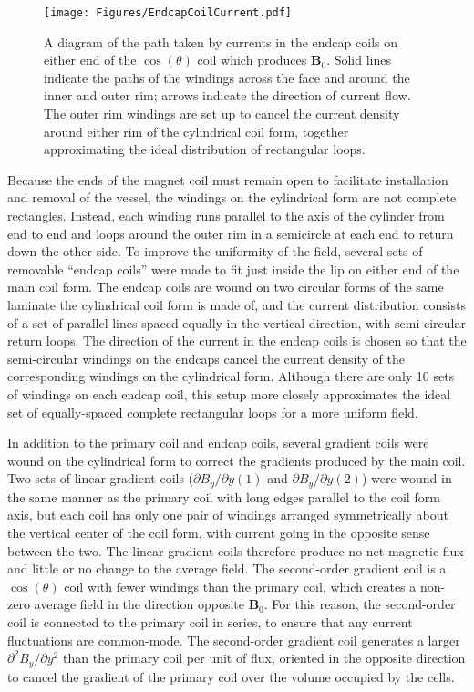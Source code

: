 \documentclass [10pt, twoside] {uwthesis}[2012/04/02]
\begin{document}
\begin{figure}[ht]
\begin{center}
\texttt{[image: Figures/EndcapCoilCurrent.pdf]}
\end{center}
\caption[Endcap coil current pattern]
{\narrower A diagram of the path taken by currents in the endcap coils on either end of the $\cos(\theta)$ coil which produces $\mathbf{B}_0$. Solid lines indicate the paths of the windings across the face and around the inner and outer rim; arrows indicate the direction of current flow. The outer rim windings are set up to cancel the current density around either rim of the cylindrical coil form, together approximating the ideal distribution of rectangular loops.}
\label{Endcap_Coil_Current}
\end{figure}

Because the ends of the magnet coil must remain open to facilitate installation and removal of the vessel, the windings on the cylindrical form are not complete rectangles. Instead, each winding runs parallel to the axis of the cylinder from end to end and loops around the outer rim in a semicircle at each end to return down the other side. To improve the uniformity of the field, several sets of removable ``endcap coils'' were made to fit just inside the lip on either end of the main coil form. The endcap coils are wound on two circular forms of the same laminate the cylindrical coil form is made of, and the current distribution consists of a set of parallel lines spaced equally in the vertical direction, with semi-circular return loops. The direction of the current in the endcap coils is chosen so that the semi-circular windings on the endcaps cancel the current density of the corresponding windings on the cylindrical form. Although there are only 10 sets of windings on each endcap coil, this setup more closely approximates the ideal set of equally-spaced complete rectangular loops for a more uniform field.

In addition to the primary coil and endcap coils, several gradient coils were wound on the cylindrical form  to correct the gradients produced by the main coil. Two sets of linear gradient coils ($\partial B_y/\partial y(1)$ and $\partial B_y/\partial y(2)$) were wound in the same manner as the primary coil with long edges parallel to the coil form axis, but each coil has only one pair of windings arranged symmetrically about the vertical center of the coil form, with current going in the opposite sense between the two. The linear gradient coils therefore produce no net magnetic flux and little or no change to the average field. The second-order gradient coil is a $\cos(\theta)$ coil with fewer windings than the primary coil, which creates a non-zero average field in the direction opposite $\mathbf{B}_0$. For this reason, the second-order coil is connected to the primary coil in series, to ensure that any current fluctuations are common-mode. The second-order gradient coil generates a larger $\partial^2 B_y/\partial y^2$ than the primary coil per unit of flux, oriented in the opposite direction to cancel the gradient of the primary coil over the volume occupied by the cells.
\end{document}
